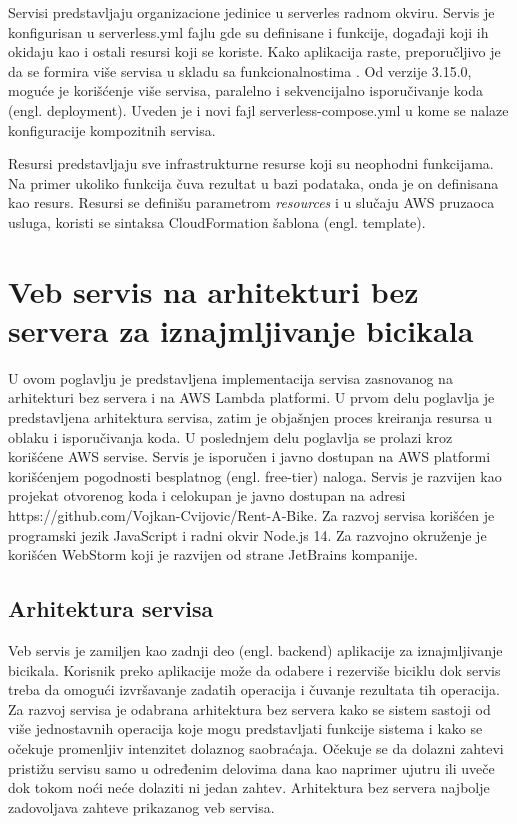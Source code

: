 \documentclass[12pt,oneside]{memoir}
\begin{document}
Servisi predstavljaju organizacione jedinice u serverles radnom okviru. Servis je konfigurisan u serverless.yml fajlu gde su definisane i funkcije, događaji koji ih okidaju kao i ostali resursi koji se koriste. Kako aplikacija raste, preporučljivo je da se formira više servisa u skladu sa funkcionalnostima \cite{sfs}. Od verzije 3.15.0, moguće je korišćenje više servisa, paralelno i sekvencijalno isporučivanje koda (engl. deployment). Uveden je i novi fajl serverless-compose.yml u kome se nalaze konfiguracije kompozitnih servisa.
 
Resursi predstavljaju sve infrastrukturne resurse koji su neophodni funkcijama. Na primer ukoliko funkcija čuva rezultat u bazi podataka, onda je on definisana kao resurs. Resursi se definišu parametrom \emph{resources} i u slučaju AWS pruzaoca usluga, koristi se sintaksa CloudFormation šablona (engl. template).


\chapter{Veb servis na arhitekturi bez servera za iznajmljivanje bicikala}
 
U ovom poglavlju je predstavljena implementacija servisa zasnovanog na arhitekturi bez servera i na AWS Lambda platformi. U prvom delu poglavlja je predstavljena arhitektura servisa, zatim je objašnjen proces kreiranja resursa u oblaku i isporučivanja koda. U poslednjem delu poglavlja se prolazi kroz korišćene AWS servise. Servis je isporučen i javno dostupan na AWS platformi korišćenjem pogodnosti besplatnog (engl. free-tier) naloga. Servis je razvijen kao projekat otvorenog koda i celokupan je javno dostupan na adresi https://github.com/Vojkan-Cvijovic/Rent-A-Bike. Za razvoj servisa korišćen je programski jezik JavaScript i radni okvir Node.js 14. Za razvojno okruženje je korišćen WebStorm koji je razvijen od strane JetBrains kompanije.


\section{Arhitektura servisa}

Veb servis je zamiljen kao zadnji deo (engl. backend) aplikacije za iznajmljivanje bicikala. Korisnik preko aplikacije može da odabere i rezerviše biciklu dok servis treba da omogući izvršavanje zadatih operacija i čuvanje rezultata tih operacija. Za razvoj servisa je odabrana arhitektura bez servera kako se sistem sastoji od više jednostavnih operacija koje mogu predstavljati funkcije sistema i kako se očekuje promenljiv intenzitet dolaznog saobraćaja. Očekuje se da dolazni zahtevi pristižu servisu samo u određenim delovima dana kao naprimer ujutru ili uveče dok tokom noći neće dolaziti ni jedan zahtev. Arhitektura bez servera najbolje zadovoljava zahteve prikazanog veb servisa.
\end{document}
